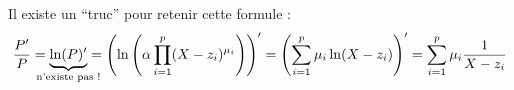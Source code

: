 \begin{rmk}
	Il existe un ``truc'' pour retenir cette formule : \[
		\frac{P'}{P} = \underbrace{\ln(P)'}_{\mathclap{\text{n'existe pas !}}}
		 = \left(\ln\left( \alpha \prod_{i=1}^p (X-z_i)^{\mu_i} \right)\right)'
		 = \left( \sum_{i=1}^p \mu_i \ln(X-z_i) \right)'
		 = \sum_{i=1}^p \mu_i \frac{1}{X-z_i}
	\]
\end{rmk}

















